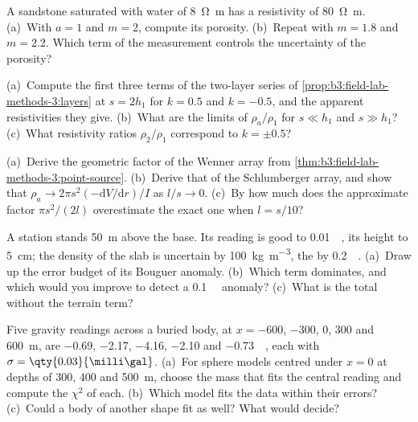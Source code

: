 \begin{exercise}[$\star\star$]\label{exo:b3:field-lab-methods-3:8}
A sandstone saturated with water of \qty{8}{\ohm\metre} has a
resistivity of \qty{80}{\ohm\metre}. (a)~With $a = 1$ and $m = 2$,
compute its porosity. (b)~Repeat with $m = 1.8$ and $m = 2.2$. Which
term of the measurement controls the uncertainty of the porosity?
\end{exercise}

\begin{exercise}[$\star\star$]\label{exo:b3:field-lab-methods-3:9}
(a)~Compute the first three terms of the two-layer series of
\cref{prop:b3:field-lab-methods-3:layers} at $s = 2h_1$ for $k =
\num{0.5}$ and $k = \num{-0.5}$, and the apparent resistivities they
give. (b)~What are the limits of $\rho_a/\rho_1$ for $s \ll h_1$ and
$s \gg h_1$? (c)~What resistivity ratios $\rho_2/\rho_1$ correspond to
$k = \pm 0.5$?
\end{exercise}

\begin{exercise}[$\star\star\star$]\label{exo:b3:field-lab-methods-3:10}
(a)~Derive the geometric factor of the Wenner array from
\cref{thm:b3:field-lab-methods-3:point-source}. (b)~Derive that of the
Schlumberger array, and show that $\rho_a \to 2\pi s^2(-\mathrm{d}V/
\mathrm{d}r)/I$ as $l/s \to 0$. (c)~By how much does the approximate
factor $\pi s^2/(2l)$ overestimate the exact one when $l = s/10$?
\end{exercise}

\begin{exercise}[$\star\star\star$]\label{exo:b3:field-lab-methods-3:11}
A station stands \qty{50}{m} above the base. Its reading is good to
\qty{0.01}{\milli\gal}, its height to \qty{5}{cm}; the density of the
slab is uncertain by \qty{100}{kg.m^{-3}}, the  by
\qty{0.2}{\milli\gal}. (a)~Draw up the error budget of its Bouguer
anomaly. (b)~Which term dominates, and which would you improve to
detect a \qty{0.1}{\milli\gal} anomaly? (c)~What is the total without
the terrain term?
\end{exercise}

\begin{exercise}[$\star\star\star$]\label{exo:b3:field-lab-methods-3:12}
Five gravity readings across a buried body, at $x = -600$, $-300$, $0$,
$300$ and \qty{600}{m}, are \num{-0.69}, \num{-2.17}, \num{-4.16},
\num{-2.10} and \qty{-0.73}{\milli\gal}, each with $\sigma =
\qty{0.03}{\milli\gal}$. (a)~For sphere models centred under $x = 0$ at
depths of \num{300}, \num{400} and \qty{500}{m}, choose the mass that
fits the central reading and compute the  $\chi^2$ of each. (b)~Which
model fits the data within their errors? (c)~Could a body of another
shape fit as well? What would decide?
\end{exercise}

